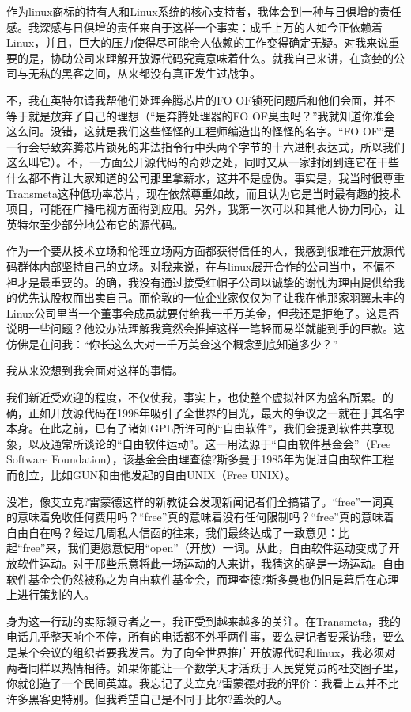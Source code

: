 作为linux商标的持有人和Linux系统的核心支持者，我体会到一种与日俱增的责任感。我深感与日俱增的责任来自于这样一个事实：成千上万的人如今正依赖着Linux，并且，巨大的压力使得尽可能令人依赖的工作变得确定无疑。对我来说重要的是，协助公司来理解开放源代码究竟意味着什么。就我自己来讲，在贪婪的公司与无私的黑客之间，从来都没有真正发生过战争。

不，我在英特尔请我帮他们处理奔腾芯片的FO OF锁死问题后和他们会面，并不等于就是放弃了自己的理想（“是奔腾处理器的FO OF臭虫吗？”我就知道你准会这么问。没错，这就是我们这些怪怪的工程师编造出的怪怪的名字。“FO OF”是一行会导致奔腾芯片锁死的非法指令行中头两个字节的十六进制表达式，所以我们这么叫它）。不，一方面公开源代码的奇妙之处，同时又从一家封闭到连它在干些什么都不肯让大家知道的公司那里拿薪水，这并不是虚伪。事实是，我当时很尊重Transmeta这种低功率芯片，现在依然尊重如故，而且认为它是当时最有趣的技术项目，可能在广播电视方面得到应用。另外，我第一次可以和其他人协力同心，让英特尔至少部分地公布它的源代码。

作为一个要从技术立场和伦理立场两方面都获得信任的人，我感到很难在开放源代码群体内部坚持自己的立场。对我来说，在与linux展开合作的公司当中，不偏不袒才是最重要的。的确，我没有通过接受红帽子公司以诚挚的谢忱为理由提供给我的优先认股权而出卖自己。而伦敦的一位企业家仅仅为了让我在他那家羽翼未丰的Linux公司里当一个董事会成员就要付给我一千万美金，但我还是拒绝了。这是否说明一些问题？他没办法理解我竟然会推掉这样一笔轻而易举就能到手的巨款。这仿佛是在问我：“你长这么大对一千万美金这个概念到底知道多少？”

我从来没想到我会面对这样的事情。

我们新近受欢迎的程度，不仅使我，事实上，也使整个虚拟社区为盛名所累。的确，正如开放源代码在1998年吸引了全世界的目光，最大的争议之一就在于其名字本身。在此之前，已有了诸如GPL所许可的“自由软件”，我们会提到软件共享现象，以及通常所谈论的“自由软件运动”。这一用法源于“自由软件基金会”（Free Software Foundation），该基金会由理查德?斯多曼于1985年为促进自由软件工程而创立，比如GUN和由他发起的自由UNIX（Free UNIX）。

没准，像艾立克?雷蒙德这样的新教徒会发现新闻记者们全搞错了。“free”一词真的意味着免收任何费用吗？“free”真的意味着没有任何限制吗？“free”真的意味着自由自在吗？经过几周私人信函的往来，我们最终达成了一致意见：比起“free”来，我们更愿意使用“open”（开放）一词。从此，自由软件运动变成了开放软件运动。对于那些乐意将此一场运动的人来讲，我猜这的确是一场运动。自由软件基金会仍然被称之为自由软件基金会，而理查德?斯多曼也仍旧是幕后在心理上进行策划的人。

身为这一行动的实际领导者之一，我正受到越来越多的关注。在Transmeta，我的电话几乎整天响个不停，所有的电话都不外乎两件事，要么是记者要采访我，要么是某个会议的组织者要我发言。为了向全世界推广开放源代码和linux，我必须对两者同样以热情相待。如果你能让一个数学天才活跃于人民党党员的社交圈子里，你就创造了一个民间英雄。我忘记了艾立克?雷蒙德对我的评价：我看上去并不比许多黑客更特别。但我希望自己是不同于比尔?盖茨的人。

